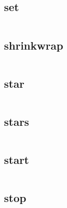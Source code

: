 \begin{lstlisting}[language=bash]

\end{lstlisting}

\subsection{set}



\begin{lstlisting}[language=bash]

\end{lstlisting}

\subsection{shrinkwrap}




\begin{lstlisting}[language=bash]

\end{lstlisting}

\subsection{star}




\begin{lstlisting}[language=bash]

\end{lstlisting}

\subsection{stars}

\begin{lstlisting}[language=bash]

\end{lstlisting}

\subsection{start}


\begin{lstlisting}[language=bash]

\end{lstlisting}

\subsection{stop}



